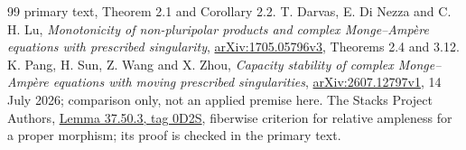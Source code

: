 \documentclass[11pt]{article}
\theoremstyle{remark}\newtheorem{remark}[theorem]{Remark}
\begin{document}
\begin{thebibliography}{99}
{primary text}, Theorem 2.1 and Corollary 2.2.
 T. Darvas, E. Di Nezza and C. H. Lu,
\emph{Monotonicity of non-pluripolar products and complex
Monge--Amp\`ere equations with prescribed singularity},
\href{https://arxiv.org/pdf/1705.05796v3}{arXiv:1705.05796v3},
Theorems 2.4 and 3.12.
 K. Pang, H. Sun, Z. Wang and X. Zhou,
\emph{Capacity stability of complex Monge--Amp\`ere equations with
moving prescribed singularities},
\href{https://arxiv.org/pdf/2607.12797v1}{arXiv:2607.12797v1},
14 July 2026; comparison only, not an applied premise here.
 The Stacks Project Authors,
\href{https://stacks.math.columbia.edu/tag/0D2S}{Lemma 37.50.3,
tag 0D2S}, fiberwise criterion for relative ampleness for a proper
morphism; its proof is checked in the primary text.
\end{thebibliography}
\end{document}
